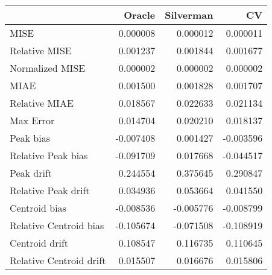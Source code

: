\begin{tabular}{lrrr}
  \hline
 & Oracle & Silverman & CV \\ 
  \hline
MISE & 0.000008 & 0.000012 & 0.000011 \\ 
  Relative MISE & 0.001237 & 0.001844 & 0.001677 \\ 
  Normalized MISE & 0.000002 & 0.000002 & 0.000002 \\ 
  MIAE & 0.001500 & 0.001828 & 0.001707 \\ 
  Relative MIAE & 0.018567 & 0.022633 & 0.021134 \\ 
  Max Error & 0.014704 & 0.020210 & 0.018137 \\ 
  Peak bias & -0.007408 & 0.001427 & -0.003596 \\ 
  Relative Peak bias & -0.091709 & 0.017668 & -0.044517 \\ 
  Peak drift & 0.244554 & 0.375645 & 0.290847 \\ 
  Relative Peak drift & 0.034936 & 0.053664 & 0.041550 \\ 
  Centroid bias & -0.008536 & -0.005776 & -0.008799 \\ 
  Relative Centroid bias & -0.105674 & -0.071508 & -0.108919 \\ 
  Centroid drift & 0.108547 & 0.116735 & 0.110645 \\ 
  Relative Centroid drift & 0.015507 & 0.016676 & 0.015806 \\ 
   \hline
\end{tabular}
